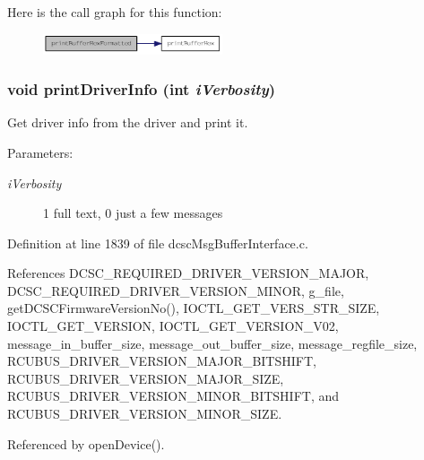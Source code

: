Here is the call graph for this function:\begin{figure}[H]
\begin{center}
\leavevmode
\includegraphics[width=150pt]{group__dcsc__msg__buffer__access_gc44ca908f157f8de95b81638e298e08e_cgraph}
\end{center}
\end{figure}
\hypertarget{group__dcsc__msg__buffer__access_g919bc832f5a0e82c07cfafd699b1b2ea}{
\subsubsection[printDriverInfo]{\setlength{\rightskip}{0pt plus 5cm}void print\-Driver\-Info (int {\em i\-Verbosity})}}
\label{group__dcsc__msg__buffer__access_g919bc832f5a0e82c07cfafd699b1b2ea}


Get driver info from the driver and print it. 

\begin{Desc}
\item[Parameters:]
\begin{description}
\item[{\em i\-Verbosity}]1 full text, 0 just a few messages \end{description}
\end{Desc}


Definition at line 1839 of file dcsc\-Msg\-Buffer\-Interface.c.

References DCSC\_\-REQUIRED\_\-DRIVER\_\-VERSION\_\-MAJOR, DCSC\_\-REQUIRED\_\-DRIVER\_\-VERSION\_\-MINOR, g\_\-file, get\-DCSCFirmware\-Version\-No(), IOCTL\_\-GET\_\-VERS\_\-STR\_\-SIZE, IOCTL\_\-GET\_\-VERSION, IOCTL\_\-GET\_\-VERSION\_\-V02, message\_\-in\_\-buffer\_\-size, message\_\-out\_\-buffer\_\-size, message\_\-regfile\_\-size, RCUBUS\_\-DRIVER\_\-VERSION\_\-MAJOR\_\-BITSHIFT, RCUBUS\_\-DRIVER\_\-VERSION\_\-MAJOR\_\-SIZE, RCUBUS\_\-DRIVER\_\-VERSION\_\-MINOR\_\-BITSHIFT, and RCUBUS\_\-DRIVER\_\-VERSION\_\-MINOR\_\-SIZE.

Referenced by open\-Device().

